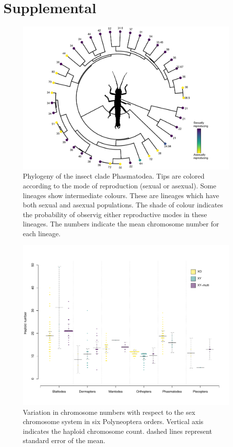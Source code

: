 \section{Supplemental}
\vfill

\setcounter{figure}{0}
\renewcommand{\thefigure}{S\arabic{figure}}
\setcounter{table}{0}
\renewcommand{\thetable}{S\arabic{table}}

\begin{figure}[!ht]
\centering \includegraphics[width=1\textwidth]{figures/phasmatodea_phylogeny.pdf}
\caption{Phylogeny of the insect clade Phasmatodea. Tips are colored according to the mode of reproduction (sexual or asexual). Some lineages show intermediate colours. These are lineages which have both sexual and asexual populations. The shade of colour indicates the probability of observig either reproductive modes in these lineages. The numbers indicate the mean chromosome number for each lineage.}
\label{fig:phas.phylo}
\end{figure}

\begin{figure}
\centering \includegraphics[width=.7\textwidth]{figures/Preliminary_data.pdf}
\caption{
Variation in chromosome numbers with respect to the sex chromosome system in six Polyneoptera orders. Vertical axis indicates the haploid chromosome count. dashed lines represent standard error of the mean.
}
\label{fig:order.plots}
\end{figure}

